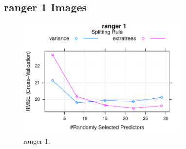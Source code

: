 
\subsection{ranger 1 Images} 
 

\begin{figure} 
\centering  
\includegraphics[width=0.77\textwidth]{ML_report_task_1ranger_RMSEvNVariables.pdf} 
\caption{\label{fig:ML_report_task_1rangerRMSEvNVariables}ranger 1.} 
\end{figure} 
 
